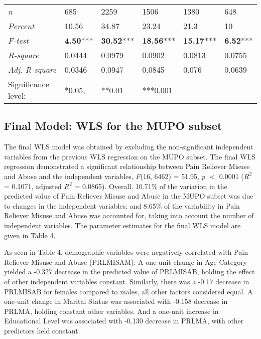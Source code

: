 \documentclass[sigconf]{acmart}
\begin{document}
\begin{table*}[ht]
\begin{tabular}{llllll}
    \midrule
    \textit{n}       & 685& 2259& 1506&  1380& 648 \\
    \textit{Percent} & 10.56& 34.87& 23.24& 21.3& 10 \\
    \textit{F-test}  & \textbf{4.50}*** & \textbf{30.52}***& \textbf{18.56}***& \textbf{15.17}***& \textbf{6.52}***  \\ 
    \textit{R-square}& 0.0444& 0.0979& 0.0902& 0.0813& 0.0755 \\ 
    \textit{Adj. R-square}& 0.0346 & 0.0947& 0.0845& 0.076& 0.0639 \\
    \bottomrule
    Significance level:&  *0.05,& **0.01& ***0.001&
  \end{tabular}
\end{table*}


\subsection{Final Model: WLS for the MUPO subset}

The final WLS model was obtained by excluding the non-significant independent 
variables from the previous WLS regression on the MUPO subset. The final WLS 
regression demonstrated a significant relationship between Pain Reliever Misuse 
and Abuse and the independent variables, \textit{F}(16, 6462) = 51.95, 
\textit{p} $<$ 0.0001 ($R^2$ = 0.1071, adjusted $R^2$ = 0.0865). Overall, 
10.71\% of the variation in the predicted value of Pain Reliever Misuse and 
Abuse in the MUPO subset was due to changes in the independent variables; 
and 8.65\% of the variability in Pain Reliever Misuse and Abuse was accounted 
for, taking into account the number of independent variables. The parameter 
estimates for the final WLS model are given in Table 4. 

As seen in Table 4, demographic variables were negatively correlated with Pain 
Reliever Misuse and Abuse (PRLMISAM): A one-unit change in Age Category yielded a 
-0.327 decrease in the predicted value of PRLMISAB, holding the effect of other 
independent variables constant. Similarly, there was a -0.17 decrease in PRLMISAB 
for females compared to males, all other factors considered equal. A one-unit 
change in Marital Status was associated with -0.158 decrease in PRLMA, holding
constant other variables. And a one-unit increase in Educational Level was 
associated with -0.130 decrease in PRLMA, with other predictors held constant. 
\end{document}
